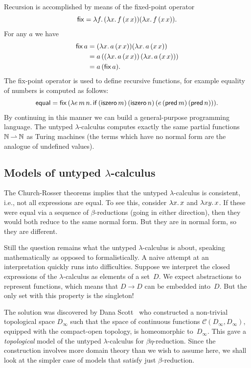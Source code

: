 %
Recursion is accomplished by means of the fixed-point operator
%
\begin{equation*}
  \mathsf{fix} = \lambda f .\,(\lambda x .\,f\,(x\,x)) (\lambda x .\,f\,(x\,x)).
\end{equation*}
%
For any $a$ we have
%
\begin{align*}
  \mathsf{fix}\,a &=
  (\lambda x .\,a\,(x\,x)) (\lambda x .\,a\,(x\,x)) \\
  &= a\,((\lambda x .\,a\,(x\,x))\,(\lambda x .\,a\,(x\,x))) \\
  &= a\,(\mathsf{fix}\,a).
\end{align*}
%
The fix-point operator is used to define recursive functions, for
example equality of numbers is computed as follows:
%
\begin{equation*}
  \mathsf{equal} = \mathsf{fix}\,(\lambda e\,m\,n .\,
    \mathsf{if}\,
    (\mathsf{iszero}\,m)\,
    (\mathsf{iszero}\,n)\,
    (e\,(\mathsf{pred}\,m)\,(\mathsf{pred}\,n))).
\end{equation*}
%
By continuing in this manner we can build a general-purpose
programming language. The untyped $\lambda$-calculus computes exactly
the same partial functions $\mathbb{N} \mathbin{\rightharpoonup} \mathbb{N}$ as Turing machines (the
terms which have no normal form are the analogue of undefined values).


\subsection{Models of untyped $\lambda$-calculus}
\label{sec:models-untyped-lambda-calculus}

The Church-Rosser theorems implies that the untyped $\lambda$-calculus
is consistent, i.e., not all expressions are equal. To see this,
consider $\lambda x .\,x$ and $\lambda x y .\,x$. If these were equal via
a sequence of $\beta$-reductions (going in either direction), then
they would both reduce to the same normal form. But they are in normal
form, so they are different.

Still the question remains what the untyped $\lambda$-calculus is
about, speaking mathematically as opposed to formalistically. A naive
attempt at an interpretation quickly runs into difficulties. Suppose
we interpret the closed expressions of the $\lambda$-calculus as
elements of a set~$D$. We expect abstractions to represent functions,
which means that $D \to D$ can be embedded into~$D$. But the only set
with this property is the singleton!

The solution was discovered by Dana Scott~\cite{Scott:Dinfty} who
constructed a non-trivial topological space $D_\infty$ such that the
space of continuous functions $\mathcal{C}(D_\infty, D_\infty)$,
equipped with the compact-open topology, is homeomorphic
to~$D_\infty$. This gave a \emph{topological} model of the untyped
$\lambda$-calculus for $\beta\eta$-reduction. Since the construction
involves more domain theory than we wish to assume here, we shall look
at the simpler case of models that satisfy just $\beta$-reduction.

